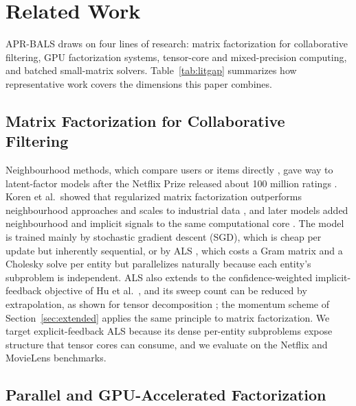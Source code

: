 \section{Related Work}
\label{sec:related}

APR-BALS draws on four lines of research: matrix factorization for collaborative filtering, GPU factorization systems, tensor-core and mixed-precision computing, and batched small-matrix solvers. Table~\ref{tab:litgap} summarizes how representative work covers the dimensions this paper combines.

\subsection{Matrix Factorization for Collaborative Filtering}

Neighbourhood methods, which compare users or items directly \cite{sarwar2001item}, gave way to latent-factor models after the Netflix Prize released about 100 million ratings \cite{bennett2007netflix}. Koren et al.\ showed that regularized matrix factorization outperforms neighbourhood approaches and scales to industrial data \cite{koren2009matrix}, and later models added neighbourhood and implicit signals to the same computational core \cite{koren2008factorization}. The model is trained mainly by stochastic gradient descent (SGD), which is cheap per update but inherently sequential, or by ALS \cite{zhou2008largescale}, which costs a Gram matrix and a Cholesky solve per entity but parallelizes naturally because each entity's subproblem is independent. ALS also extends to the confidence-weighted implicit-feedback objective of Hu et al.\ \cite{hu2008collaborative}, and its sweep count can be reduced by extrapolation, as shown for tensor decomposition \cite{ma2022pairwise,evans2023blockwise}; the momentum scheme of Section~\ref{sec:extended} applies the same principle to matrix factorization. We target explicit-feedback ALS because its dense per-entity subproblems expose structure that tensor cores can consume, and we evaluate on the Netflix and MovieLens \cite{harper2016movielens} benchmarks.

\subsection{Parallel and GPU-Accelerated Factorization}

